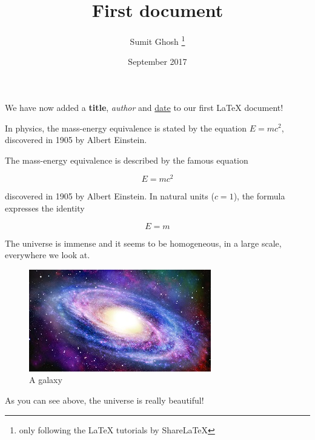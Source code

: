\documentclass[12pt, letterpaper]{article}
\title{First document}
\author{Sumit Ghosh \thanks{only following the LaTeX tutorials by ShareLaTeX}}
\date{September 2017}
\begin{document}
\maketitle

We have now added a \textbf{title}, \textit{author} and \underline{date} to our first \LaTeX{} document!

In physics, the mass-energy equivalence is stated by the equation $E=mc^2$, discovered in 1905 by Albert Einstein.

The mass-energy equivalence is described by the famous equation

$$E=mc^2$$

discovered in 1905 by Albert Einstein.
In natural units ($c=1$), the formula expresses the identity

\begin{equation}
E=m
\end{equation}

The universe is immense and it seems to be homogeneous, in a large scale, everywhere we look at.

\begin{figure}[h]
	\centering
	\includegraphics{galaxy}
	\caption{A galaxy}
	\label{fig:mesh1}
\end{figure}

As you can see above, the universe is really beautiful!
\end{document}
